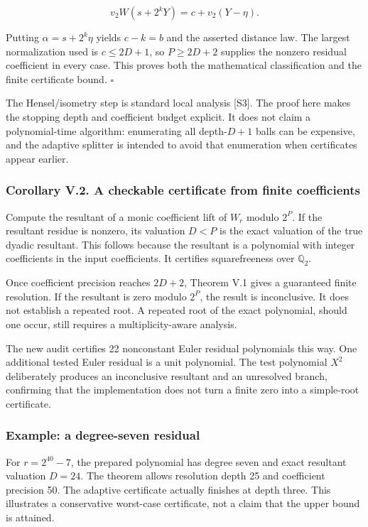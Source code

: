 \documentclass[11pt,letterpaper]{article}
\begin{document}
\[
v_2W(s+2^kY)=c+v_2(Y-\eta).
\]

Putting \(\alpha=s+2^k\eta\) yields \(c-k=b\) and the asserted distance law. The largest normalization used is \(c\le2D+1\), so \(P\ge2D+2\) supplies the nonzero residual coefficient in every case. This proves both the mathematical classification and the finite certificate bound. \(\square\)

The Hensel/isometry step is standard local analysis {[}S3{]}. The proof here makes the stopping depth and coefficient budget explicit. It does not claim a polynomial-time algorithm: enumerating all depth-\(D+1\) balls can be expensive, and the adaptive splitter is intended to avoid that enumeration when certificates appear earlier.

\subsubsection{Corollary V.2. A checkable certificate from finite coefficients}\label{corollary-v.2.-a-checkable-certificate-from-finite-coefficients}

Compute the resultant of a monic coefficient lift of \(W_r\) modulo \(2^P\). If the resultant residue is nonzero, its valuation \(D<P\) is the exact valuation of the true dyadic resultant. This follows because the resultant is a polynomial with integer coefficients in the input coefficients. It certifies squarefreeness over \(\mathbb Q_2\).

Once coefficient precision reaches \(2D+2\), Theorem V.1 gives a guaranteed finite resolution. If the resultant is zero modulo \(2^P\), the result is inconclusive. It does not establish a repeated root. A repeated root of the exact polynomial, should one occur, still requires a multiplicity-aware analysis.

The new audit certifies 22 nonconstant Euler residual polynomials this way. One additional tested Euler residual is a unit polynomial. The test polynomial \(X^2\) deliberately produces an inconclusive resultant and an unresolved branch, confirming that the implementation does not turn a finite zero into a simple-root certificate.

\subsubsection{Example: a degree-seven residual}\label{example-a-degree-seven-residual}

For \(r=2^{40}-7\), the prepared polynomial has degree seven and exact resultant valuation \(D=24\). The theorem allows resolution depth 25 and coefficient precision 50. The adaptive certificate actually finishes at depth three. This illustrates a conservative worst-case certificate, not a claim that the upper bound is attained.
\end{document}
